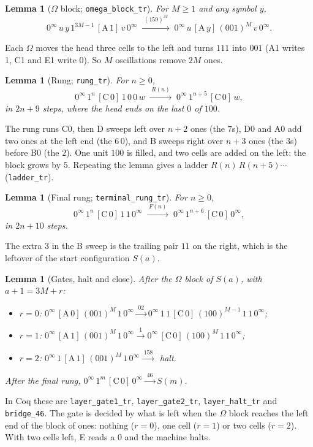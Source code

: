 \documentclass[11pt]{article}
\newtheorem{lemma}[theorem]{Lemma}
\theoremstyle{definition}
\theoremstyle{remark}
\newcommand{\hd}[2]{[\mathrm{#1}\,#2]}
\newcommand{\Z}{0^{\infty}}
\newcommand{\coq}[1]{\texttt{#1}}
\begin{document}
\begin{lemma}[$\Omega$ block; \coq{omega\_block\_tr}]\label{lem:omega}
For $M\ge1$ and any symbol $y$,
\[
\Z\,u\,y\,1^{3M-1}\,\hd{A}{1}\,v\,\Z
\;\xrightarrow{\;(159)^M\;}\;
\Z\,u\,\hd{A}{y}\,(001)^{M}\,v\,\Z .
\]
\end{lemma}
Each $\Omega$ moves the head three cells to the left and turns $111$ into $001$
(A1 writes 1, C1 and E1 write 0). So $M$ oscillations remove $2M$ ones.

\begin{lemma}[Rung; \coq{rung\_tr}]\label{lem:rung}
For $n\ge0$,
\[
\Z\,1^{n}\,\hd{C}{0}\,1\,0\,0\,w
\;\xrightarrow{\;R(n)\;}\;
\Z\,1^{n+5}\,\hd{C}{0}\,w ,
\]
in $2n+9$ steps, where the head ends on the last $0$ of $100$.
\end{lemma}
The rung runs C0, then D sweeps left over $n+2$ ones (the $7$s), D0 and A0 add two ones
at the left end (the $6\,0$), and B sweeps right over $n+3$ ones (the $3$s) before B0
(the $2$). One unit $100$ is filled, and two cells are added on the left: the block
grows by $5$. Repeating the lemma gives a ladder $R(n)\,R(n+5)\cdots$
(\coq{ladder\_tr}).

\begin{lemma}[Final rung; \coq{terminal\_rung\_tr}]\label{lem:final}
For $n\ge0$,
\[
\Z\,1^{n}\,\hd{C}{0}\,1\,1\,\Z
\;\xrightarrow{\;F(n)\;}\;
\Z\,1^{n+6}\,\hd{C}{0}\,\Z ,
\]
in $2n+10$ steps.
\end{lemma}
The extra $3$ in the B sweep is the trailing pair $11$ on the right, which is the
leftover of the start configuration $S(a)$.

\begin{lemma}[Gates, halt and close]\label{lem:bridge}
After the $\Omega$ block of $S(a)$, with $a+1 = 3M+r$:
\begin{itemize}
\item $r=0$: $\Z\,\hd{A}{0}\,(001)^M\,1\,\Z \xrightarrow{\;02\;}
      \Z\,1\,1\,\hd{C}{0}\,(100)^{M-1}\,1\,1\,\Z$;
\item $r=1$: $\Z\,\hd{A}{1}\,(001)^M\,1\,\Z \xrightarrow{\;1\;}
      \Z\,\hd{C}{0}\,(100)^{M}\,1\,1\,\Z$;
\item $r=2$: $\Z\,1\,\hd{A}{1}\,(001)^M\,1\,\Z \xrightarrow{\;158\;}$ halt.
\end{itemize}
After the final rung, $\Z\,1^{m}\,\hd{C}{0}\,\Z \xrightarrow{\;46\;} S(m)$.
\end{lemma}
In Coq these are \coq{layer\_gate1\_tr}, \coq{layer\_gate2\_tr},
\coq{layer\_halt\_tr} and \coq{bridge\_46}. The gate is decided by what is left when the $\Omega$ block reaches the left end of
the block of ones: nothing ($r=0$), one cell ($r=1$) or two cells ($r=2$). With two
cells left, E reads a $0$ and the machine halts.
\end{document}
